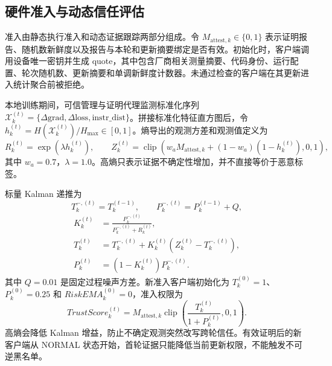 \documentclass[11pt, a4paper, UTF8, fontset=fandol]{ctexart}
\begin{document}
\subsection{硬件准入与动态信任评估}
准入由静态执行准入和动态证据跟踪两部分组成。令
$M_{\mathrm{attest},k}\in\{0,1\}$ 表示证明报告、随机数新鲜度以及报告与本轮和更新摘要绑定是否有效。初始化时，客户端调用设备唯一密钥并生成 quote，其中包含厂商相关测量摘要、代码身份、运行配置、轮次随机数、更新摘要和单调新鲜度计数器。未通过检查的客户端在其更新进入统计聚合前被拒绝。

本地训练期间，可信管理与证明代理监测标准化序列
$\mathcal{X}_k^{(t)}=\{\Delta\mathrm{grad},\Delta\mathrm{loss},
\mathrm{instr\_dist}\}$。拼接标准化特征直方图后，令
$h_k^{(t)}=H(\mathcal{X}_k^{(t)})/H_{\max}\in[0,1]$。熵导出的观测方差和观测值定义为
\begin{equation}
    R_k^{(t)}=\exp(\lambda h_k^{(t)}),\qquad
    Z_k^{(t)}=\operatorname{clip}\!\left(
    w_aM_{\mathrm{attest},k}+(1-w_a)(1-h_k^{(t)}),0,1\right),
\end{equation}
其中 $w_a=0.7$，$\lambda=1.0$。高熵只表示证据不确定性增加，并不直接等价于恶意标签。

标量 Kalman 递推为
\begin{equation}
    T_k^{-,(t)}=T_k^{(t-1)},\qquad P_k^{-,(t)}=P_k^{(t-1)}+Q,
\end{equation}
\begin{equation}
\begin{aligned}
    K_k^{(t)}&=\frac{P_k^{-,(t)}}{P_k^{-,(t)}+R_k^{(t)}},\\
    T_k^{(t)}&=T_k^{-,(t)}+K_k^{(t)}
        \left(Z_k^{(t)}-T_k^{-,(t)}\right),\\
    P_k^{(t)}&=(1-K_k^{(t)})P_k^{-,(t)}.
\end{aligned}
\end{equation}
其中 $Q=0.01$ 是固定过程噪声方差。新准入客户端初始化为
$T_k^{(0)}=1$、$P_k^{(0)}=0.25$ 和 $RiskEMA_k^{(0)}=0$，准入权限为
\begin{equation}
    TrustScore_k^{(t)}=M_{\mathrm{attest},k}
    \operatorname{clip}\!\left(\frac{T_k^{(t)}}{1+P_k^{(t)}},0,1\right).
\end{equation}
高熵会降低 Kalman 增益，防止不确定观测突然改写跨轮信任。有效证明后的新客户端从 NORMAL 状态开始，首轮证据只能降低当前更新权限，不能触发不可逆黑名单。
\end{document}
